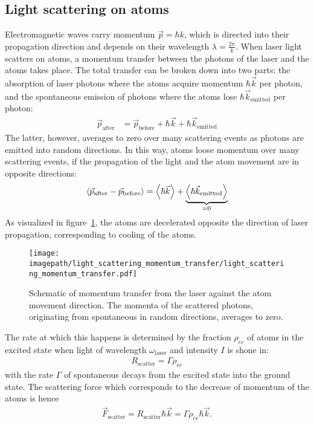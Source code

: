 \subsection*{Light scattering on atoms}
Electromagnetic waves carry momentum $\vec p = \hbar k$, which is directed into their propagation direction and depends on their wavelength $\lambda = \frac{2\pi}{k}$. When laser light scatters on atoms, a momentum transfer between the photons of the laser and the atoms takes place. The total transfer can be broken down into two parts: the absorption of laser photons where the atoms acquire momentum $\hbar \vec k$ per photon, and the spontaneous emission of photons where the atoms lose $\hbar \vec k_\text{emitted}$ per photon:
\begin{align}
    \vec p_\text{after} &= \vec p_\text{before} + \hbar \vec k + \hbar \vec k_\text{emitted}
\end{align}
The latter, however, averages to zero over many scattering events as photons are emitted into random directions. In this way, atoms loose momentum over many scattering events, if the propagation of the light and the atom movement are in opposite directions:
\begin{align}
    \Braket{\vec p_\text{after} - \vec p_\text{before}} = \Braket{\hbar \vec k} + \underbrace{\Braket{\hbar \vec k_\text{emitted}}}_{=0}
\end{align}
As visualized in figure~\ref{fig:light_scattering_momentum_transfer}, the atoms are decelerated opposite the direction of laser propagation, corresponding to cooling of the atoms.

\begin{figure}    
    \centering
    \texttt{[image: \\imagepath/light\_scattering\_momentum\_transfer/light\_scattering\_momentum\_transfer.pdf]}
    \caption{Schematic of momentum transfer from the laser against the atom movement direction. The momenta of the scattered photons, originating from spontaneous in random directions, averages to zero.}\label{fig:light_scattering_momentum_transfer}
\end{figure}

The rate at which this happens is determined by the fraction $\rho_{ee}$ of atoms in the excited state when light of wavelength $\omega_\text{laser}$ and intensity $I$ is shone in:
\begin{align}
    R_\text{scatter} = \Gamma \rho_{ee}
\end{align}
with the rate $\Gamma$ of spontaneous decays from the excited state into the ground state. The scattering force which corresponds to the decrease of momentum of the atoms is hence
\begin{align}
    \vec F_\text{scatter} = R_\text{scatter} \hbar \vec k = \Gamma \rho_{ee} \hbar \vec k.
\end{align}

